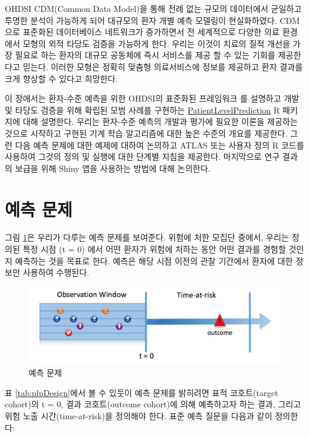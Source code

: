 \documentclass[11pt]{book}
\theoremstyle{definition}
\theoremstyle{definition}
\theoremstyle{definition}
\theoremstyle{remark}
\begin{document}
OHDSI CDM(Common Data Model)을 통해 전례 없는 규모의 데이터에서 균일하고
투명한 분석이 가능하게 되어 대규모의 환자 개별 예측 모델링이
현실화하였다. CDM으로 표준화된 데이터베이스 네트워크가 증가하면서 전
세계적으로 다양한 의료 환경에서 모형의 외적 타당도 검증을 가능하게 한다.
우리는 이것이 치료의 질적 개선을 가장 필요로 하는 환자의 대규모 공동체에
즉시 서비스를 제공 할 수 있는 기회를 제공한다고 믿는다. 이러한 모형은
정확히 맞춤형 의료서비스에 정보를 제공하고 환자 결과를 크게 향상할 수
있다고 희망한다.

이 장에서는 환자-수준 예측을 위한 OHDSI의 표준화된 프레임워크
\citep{reps2018} 를 설명하고 개발 및 타당도 검증을 위해 확립된 모범
사례를 구현하는
\href{https://ohdsi.github.io/PatientLevelPrediction/}{PatientLevelPrediction}
R 패키지에 대해 설명한다. 우리는 환자-수준 예측의 개발과 평가에 필요한
이론을 제공하는 것으로 시작하고 구현된 기계 학습 알고리즘에 대한 높은
수준의 개요를 제공한다. 그런 다음 예측 문제에 대한 예제에 대하여
논의하고 ATLAS 또는 사용자 정의 R 코드를 사용하여 그것의 정의 및 실행에
대한 단계별 지침을 제공한다. 마지막으로 연구 결과의 보급을 위해 Shiny
앱을 사용하는 방법에 대해 논의한다.

\section{예측 문제}\label{-}

그림 \ref{fig:figure1}은 우리가 다루는 예측 문제를 보여준다. 위험에 처한
모집단 중에서, 우리는 정의된 특정 시점 (t = 0) 에서 어떤 환자가 위험에
처하는 동안 어떤 결과를 경험할 것인지 예측하는 것을 목표로 한다. 예측은
해당 시점 이전의 관찰 기간에서 환자에 대한 정보만 사용하여 수행된다.

\begin{figure}

{\centering \includegraphics[width=1\linewidth]{images/PatientLevelPrediction/Figure1} 

}

\caption{예측 문제}\label{fig:figure1}
\end{figure}

표 \ref{tab:plpDesign}에서 볼 수 있듯이 예측 문제를 밝히려면 표적
코호트(target cohort)의 t = 0, 결과 코호트(outcome cohort)에 의해
예측하고자 하는 결과, 그리고 위험 노출 시간(time-at-risk)을 정의해야
한다. 표준 예측 질문을 다음과 같이 정의한다: 
 
\end{document}
